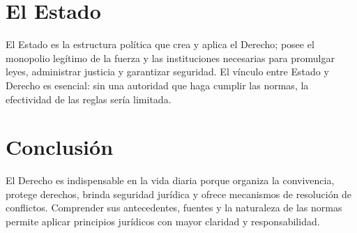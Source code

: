 \section{El Estado}
El Estado es la estructura política que crea y aplica el Derecho; posee el monopolio legítimo de la fuerza y las instituciones necesarias para promulgar leyes, administrar justicia y garantizar seguridad. El vínculo entre Estado y Derecho es esencial: sin una autoridad que haga cumplir las normas, la efectividad de las reglas sería limitada.

\section{Conclusión}
El Derecho es indispensable en la vida diaria porque organiza la convivencia, protege derechos, brinda seguridad jurídica y ofrece mecanismos de resolución de conflictos. Comprender sus antecedentes, fuentes y la naturaleza de las normas permite aplicar principios jurídicos con mayor claridad y responsabilidad.


